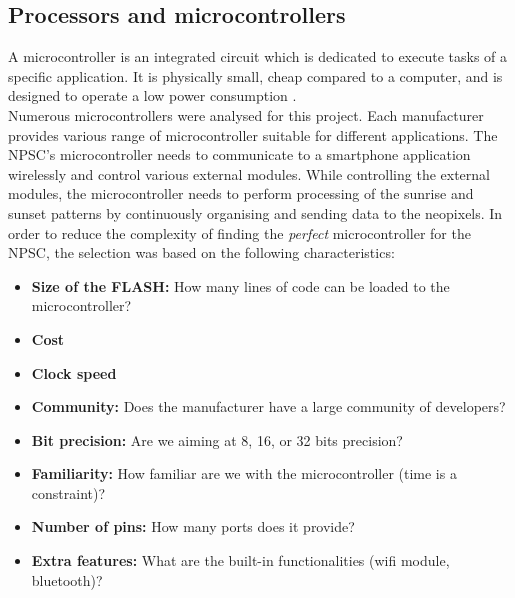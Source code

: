 \subsection{Processors and microcontrollers}
A microcontroller is an integrated circuit which is dedicated to execute tasks of a specific application. It is physically small, cheap compared to a computer, and is designed to operate a low power consumption \cite{ho2000}.\\
Numerous microcontrollers were analysed for this project. Each manufacturer provides various range of microcontroller suitable for different applications.
The NPSC's microcontroller needs to communicate to a smartphone application wirelessly and control various external modules. While controlling the external modules, the microcontroller needs to perform processing of the sunrise and sunset patterns by continuously organising and sending data to the neopixels. In order to reduce the complexity of finding the \textit{perfect} microcontroller for the NPSC, the selection was based on the following characteristics:
\begin{itemize}
\item \textbf{Size of the FLASH:} How many lines of code can be loaded to the microcontroller?
\item \textbf{Cost}
\item \textbf{Clock speed}
\item \textbf{Community:} Does the manufacturer have a large community of developers?
\item \textbf{Bit precision:} Are we aiming at 8, 16, or 32 bits precision? 
\item \textbf{Familiarity:} How familiar are we with the microcontroller (time is a constraint)?
\item \textbf{Number of pins:} How many ports does it provide?\
\item \textbf{Extra features:} What are the built-in functionalities (wifi module, bluetooth)?
\end{itemize}

